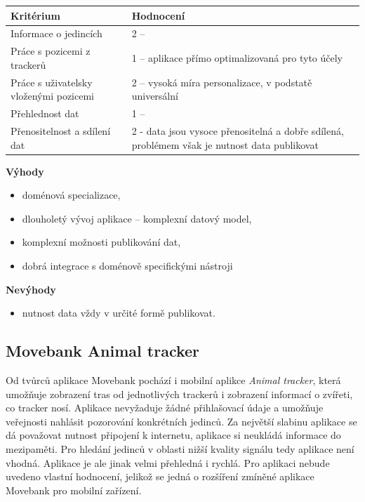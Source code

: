 

\begin{table}[h]
	\begin{tabular}{ l | l }
		Kritérium                              & Hodnocení \\
		\hline			
		Informace o jedincích                  & 2 --           \\
		Práce s pozicemi z trackerů            & 1 -- aplikace přímo optimalizovaná pro tyto účely          \\
		Práce s uživatelsky vloženými pozicemi & 2 -- vysoká míra personalizace, v podstatě universální          \\
		Přehlednost dat                        & 1 --           \\
		Přenositelnost a sdílení dat           & 2 - data jsou vysoce přenositelná a dobře sdílená, problémem však je nutnost data publikovat          \\
		\hline	
	\end{tabular}
\end{table}

\textbf{Výhody}

\begin{itemize}
	\item doménová specializace,
	\item dlouholetý vývoj aplikace -- komplexní datový model,
	\item komplexní možnosti publikování dat,
	\item dobrá integrace s doménově specifickými nástroji
\end{itemize}

\textbf{Nevýhody}

\begin{itemize}
	\item nutnost data vždy v určité formě publikovat.
\end{itemize}

\subsection{Movebank Animal tracker}

Od tvůrců aplikace Movebank pochází i mobilní aplikce \emph{Animal tracker}, která umožňuje zobrazení tras od jednotlivých trackerů i zobrazení informací o zvířeti, co tracker nosí. Aplikace nevyžaduje žádné přihlašovací údaje a umožňuje veřejnosti nahlásit pozorování konkrétních jedinců. Za největší slabinu aplikace se dá považovat nutnost připojení k internetu, aplikace si neukládá informace do mezipaměti. Pro hledání jedinců v oblasti nižší kvality signálu tedy aplikace není vhodná. Aplikace je ale jinak velmi přehledná i rychlá. Pro aplikaci nebude uvedeno vlastní hodnocení, jelikož se jedná o rozšíření zmíněné aplikace Movebank pro mobilní zařízení.

